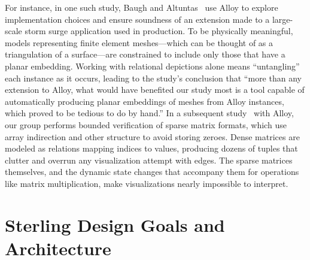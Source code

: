 \documentclass[runningheads]{llncs}
\begin{document}
For instance, in one such study, Baugh and Altuntas~\cite{baugh-scp-2018} use Alloy to explore implementation choices and ensure soundness of an extension made to a large-scale storm surge application used in production.
To be physically meaningful, models representing finite element meshes---which can be thought of as a triangulation of a surface---are constrained to include only those that have a planar embedding.
Working with relational depictions alone means ``untangling'' each instance as it occurs, leading to the study's conclusion that ``more than any extension to Alloy, what would have benefited our study most is a tool capable of automatically producing planar embeddings of meshes from Alloy instances, which proved to be tedious to do by hand.''
In a subsequent study~\cite{dyer2019} with Alloy, our group performs bounded verification of sparse matrix formats, which use array indirection and other structure to avoid storing zeroes.
Dense matrices are modeled as relations mapping indices to values, producing dozens of tuples that clutter and overrun any visualization attempt with edges.
The sparse matrices themselves, and the dynamic state changes that accompany them for operations like matrix multiplication, make visualizations nearly impossible to interpret.


\section{Sterling Design Goals and Architecture}
\label{sterling}

\end{document}
